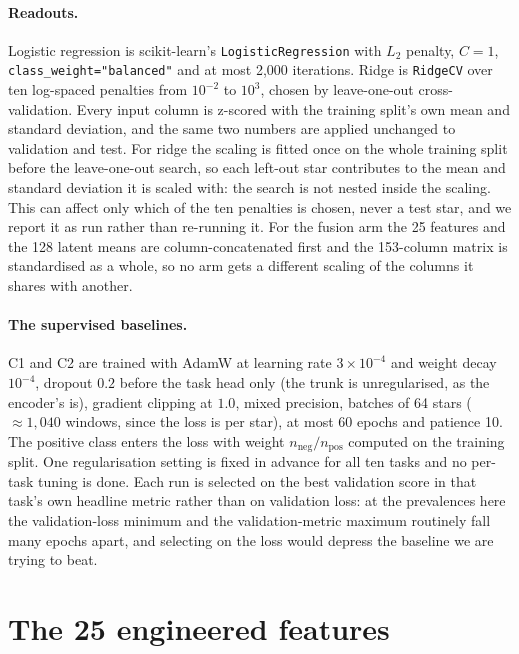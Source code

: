 \documentclass{article}
\begin{document}
\paragraph{Readouts.} Logistic regression is scikit-learn's \texttt{LogisticRegression} with $L_{2}$
penalty, $C=1$, \texttt{class\_weight="balanced"} and at most 2{,}000 iterations. Ridge is
\texttt{RidgeCV} over ten log-spaced penalties from $10^{-2}$ to $10^{3}$, chosen by leave-one-out
cross-validation. Every input column is z-scored with the training split's own mean and standard
deviation, and the same two numbers are applied unchanged to validation and test. For ridge the
scaling is fitted once on the whole training split before the leave-one-out search, so each left-out
star contributes to the mean and standard deviation it is scaled with: the search is not nested
inside the scaling. This can affect only which of the ten penalties is chosen, never a test star, and
we report it as run rather than re-running it. For the fusion arm
the 25 features and the 128 latent means are column-concatenated first and the 153-column matrix is
standardised as a whole, so no arm gets a different scaling of the columns it shares with another.

\paragraph{The supervised baselines.} C1 and C2 are trained with AdamW at learning rate
$3\times10^{-4}$ and weight decay $10^{-4}$, dropout $0.2$ before the task head only (the trunk is
unregularised, as the encoder's is), gradient clipping at $1.0$, mixed precision, batches of 64
stars ($\approx 1{,}040$ windows, since the loss is per star), at most 60 epochs and patience 10.
The positive class enters the loss with weight $n_{\mathrm{neg}}/n_{\mathrm{pos}}$ computed on the
training split. One regularisation setting is fixed in advance for all ten tasks and no per-task
tuning is done. Each run is selected on the best validation score in that task's own headline metric
rather than on validation loss: at the prevalences here the validation-loss minimum and the
validation-metric maximum routinely fall many epochs apart, and selecting on the loss would depress
the baseline we are trying to beat.

\section{The 25 engineered features}
\label{app:features}
\end{document}
